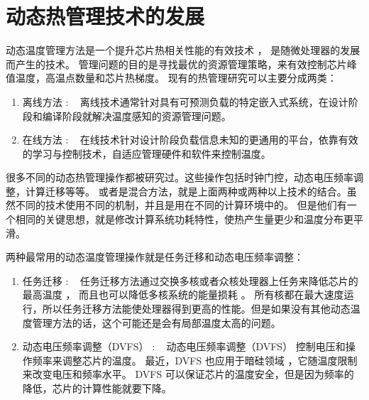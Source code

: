\section{动态热管理技术的发展}\label{sec:his}

动态温度管理方法是一个提升芯片热相关性能的有效技术 ， 是随微处理器的发展而产生的技术。
管理问题的目的是寻找最优的资源管理策略，来有效控制芯片峰值温度，高温点数量和芯片热梯度。
现有的热管理研究可以主要分成两类：
\begin{enumerate}
\item 离线方法 : ~ 离线技术通常针对具有可预测负载的特定嵌入式系统，在设计阶段和编译阶段就解决温度感知的资源管理问题。
\item 在线方法 : ~ 在线技术针对设计阶段负载信息未知的更通用的平台，依靠有效的学习与控制技术，自适应管理硬件和软件来控制温度。
\end{enumerate}

很多不同的动态热管理操作都被研究过。这些操作包括时钟门控，动态电压频率调整，计算迁移等等。
或者是混合方法，就是上面两种或两种以上技术的结合。虽然不同的技术使用不同的机制，并且是用在不同的计算环境中的。
但是他们有一个相同的关键思想，就是修改计算系统功耗特性，使热产生量更少和温度分布更平滑。

两种最常用的动态温度管理操作就是任务迁移和动态电压频率调整：
\begin{enumerate}
\item 任务迁移 :  ~ 任务迁移方法通过交换多核或者众核处理器上任务来降低芯片的最高温度  ，
而且也可以降低多核系统的能量损耗 。
所有核都在最大速度运行，所以任务迁移方法能使处理器得到更高的性能。但是如果没有其他动态温度管理方法的话，这个可能还是会有局部温度太高的问题。
\item 动态电压频率调整（DVFS） :  ~ 动态电压频率调整（DVFS） 控制电压和操作频率来调整芯片的温度。
 最近，DVFS 也应用于暗硅领域 ，它随温度限制来改变电压和频率水平。
 DVFS 可以保证芯片的温度安全，但是因为频率的降低，芯片的计算性能就要下降。
\end{enumerate}


 
 
